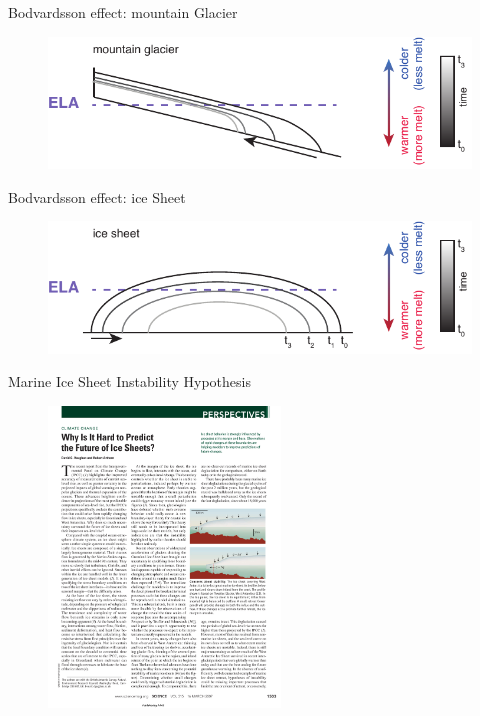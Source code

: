 \documentclass[hide notes,intlimits]{beamer}
\begin{document}
{
%
} 

\begin{frame}{Bodvardsson effect: mountain Glacier}
 \begin{figure}
    \includegraphics[width=\textwidth]{bodvardsson-effect_mountain_glacier}
  \end{figure}
\end{frame}

\begin{frame}{Bodvardsson effect: ice Sheet}
 \begin{figure}
    \includegraphics[width=\textwidth]{bodvardsson-effect_ice_sheet}
  \end{figure}
\end{frame}

\begin{frame}{Marine Ice Sheet Instability Hypothesis}
 \begin{figure}
    \includegraphics[height=8cm]{vaughan-misi}
  \end{figure}
\end{frame}
\end{document}
